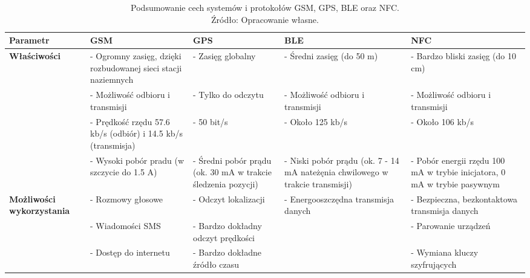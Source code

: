 \begin{table}[H]
\centering
\caption{Podsumowanie cech systemów i protokołów GSM, GPS, BLE oraz NFC.\\ Źródło: Opracowanie własne.}
\label{table:table_nmea_messages}
\begin{tabular}{| p{2.5cm} | p{3.5cm} | p{3cm} | p{3cm} | p{3.5cm} |}
\hline
\textbf{Parametr} &  \textbf{GSM} & \textbf{GPS}	& \textbf{BLE} & \textbf{NFC} \\ \hline	
\textbf{Właściwości} & - Ogromny zasięg, dzięki rozbudowanej sieci stacji naziemnych & - Zasięg globalny & - Średni zasięg (do 50 m) & - Bardzo bliski zasięg (do 10 cm) \\
			& - Możliwość odbioru i transmisji & - Tylko do odczytu & - Możliwość odbioru i transmisji & - Możliwość odbioru i transmisji \\
			& - Prędkość rzędu 57.6 kb/s (odbiór) i 14.5 kb/s (transmisja) & - 50 bit/s & - Około 125 kb/s & - Około 106 kb/s \\
			& - Wysoki pobór pradu (w szczycie do 1.5 A) & - Średni pobór prądu (ok. 30 mA w trakcie śledzenia pozycji) & - Niski pobór prądu (ok. 7 - 14 mA nateżęnia chwilowego w trakcie transmisji) & - Pobór energii rzędu 100 mA w trybie inicjatora, 0 mA w trybie pasywnym \\ \hline
\textbf{Możliwości wykorzystania} & - Rozmowy głosowe & - Odczyt lokalizacji & - Energooszczędna transmisja danych & - Bezpieczna, bezkontaktowa transmisja danych \\
						& - Wiadomości SMS & - Bardzo dokładny odczyt prędkości & & - Parowanie urządzeń \\
						& - Dostęp do internetu & - Bardzo dokładne źródło czasu & & - Wymiana kluczy szyfrujących \\ \hline
\end{tabular}
\end{table}

